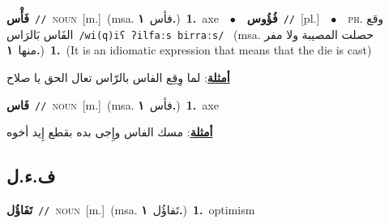\documentclass[10pt,a4paper,twoside]{article} %
\begin{document}
\begin{multicols}{2}
{\setlength\topsep{0pt}\textbf{\foreignlanguage{arabic}{فَأْس}}\ {\color{gray}\texttt{//}\color{black}}\ \textsc{noun}\ [m.]\ \color{gray}(msa. \foreignlanguage{arabic}{فأس}~\foreignlanguage{arabic}{\textbf{١.}})\color{black}\ \textbf{1.}~axe\ \ $\bullet$\ \ \setlength\topsep{0pt}\textbf{\foreignlanguage{arabic}{فُؤُوس}}\ {\color{gray}\texttt{//}\color{black}}\ [pl.]\ \ $\bullet$\ \ \textsc{ph.} \color{gray} \foreignlanguage{arabic}{وقع الفَاس بَالرَاس}\color{black}\ {\color{gray}\texttt{/{\sffamily wi(q)iʕ ʔilfaːs birraːs}/}\color{black}}\ \color{gray} (msa. \foreignlanguage{arabic}{حصلت المصيبة ولا مفر منها}~\foreignlanguage{arabic}{\textbf{١.}})\color{black}\ \textbf{1.}~(It is an idiomatic expression that means that the die is cast)\  \begin{flushright}\color{gray}\foreignlanguage{arabic}{\textbf{\underline{\foreignlanguage{arabic}{أمثلة}}}: لما وِقِع الفاس بالرّاس تعال الحق يا صلاح}\end{flushright}\color{black}} \vspace{2mm}

{\setlength\topsep{0pt}\textbf{\foreignlanguage{arabic}{فَاس}}\ {\color{gray}\texttt{//}\color{black}}\ \textsc{noun}\ [m.]\ \color{gray}(msa. \foreignlanguage{arabic}{فأس}~\foreignlanguage{arabic}{\textbf{١.}})\color{black}\ \textbf{1.}~axe\  \begin{flushright}\color{gray}\foreignlanguage{arabic}{\textbf{\underline{\foreignlanguage{arabic}{أمثلة}}}: مسك الفاس وإِجى بده بقطع إِيد أخوه}\end{flushright}\color{black}} \vspace{2mm}

\vspace{-3mm}
\subsection*{\color{blue}\foreignlanguage{arabic}{ف.ء.ل}\color{blue}{}} 

{\setlength\topsep{0pt}\textbf{\foreignlanguage{arabic}{تَفَاؤُل}}\ {\color{gray}\texttt{//}\color{black}}\ \textsc{noun}\ [m.]\ \color{gray}(msa. \foreignlanguage{arabic}{تَفاؤُل}~\foreignlanguage{arabic}{\textbf{١.}})\color{black}\ \textbf{1.}~optimism\ 

}
\end{multicols}
\end{document}

